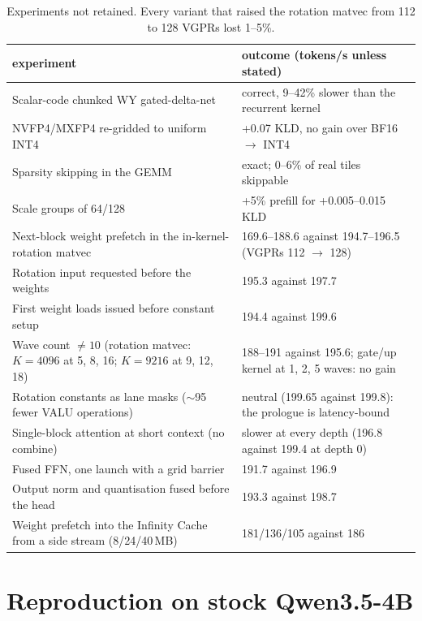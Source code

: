 \documentclass[10.5pt,a4paper]{article}
\begin{document}
\begin{table}[H]
\centering\small
\begin{tabularx}{\linewidth}{@{}>{\raggedright\arraybackslash}p{6.0cm}X@{}}
\toprule
experiment & outcome (tokens/s unless stated)\\
\midrule
Scalar-code chunked WY gated-delta-net & correct, 9--42\% slower than the recurrent kernel\\
NVFP4/MXFP4 re-gridded to uniform INT4 & +0.07 KLD, no gain over BF16 $\to$ INT4\\
Sparsity skipping in the GEMM & exact; 0--6\% of real tiles skippable\\
Scale groups of 64/128 & +5\% prefill for +0.005--0.015 KLD\\
Next-block weight prefetch in the in-kernel-rotation matvec & 169.6--188.6 against 194.7--196.5 (VGPRs 112 $\to$ 128)\\
Rotation input requested before the weights & 195.3 against 197.7\\
First weight loads issued before constant setup & 194.4 against 199.6\\
Wave count $\ne10$ (rotation matvec: $K{=}4096$ at 5, 8, 16; $K{=}9216$ at 9, 12, 18) & 188--191 against 195.6; gate/up kernel at 1, 2, 5 waves: no gain\\
Rotation constants as lane masks ($\sim$95 fewer VALU operations) & neutral (199.65 against 199.8): the prologue is latency-bound\\
Single-block attention at short context (no combine) & slower at every depth (196.8 against 199.4 at depth 0)\\
Fused FFN, one launch with a grid barrier & 191.7 against 196.9\\
Output norm and quantisation fused before the head & 193.3 against 198.7\\
Weight prefetch into the Infinity Cache from a side stream (8/24/40\,MB) & 181/136/105 against 186\\
\bottomrule
\end{tabularx}
\caption{Experiments not retained. Every variant that raised the rotation matvec from 112 to 128 VGPRs lost 1--5\%.}
\end{table}

\section{Reproduction on stock Qwen3.5-4B}
\label{sec:repro}
\end{document}
